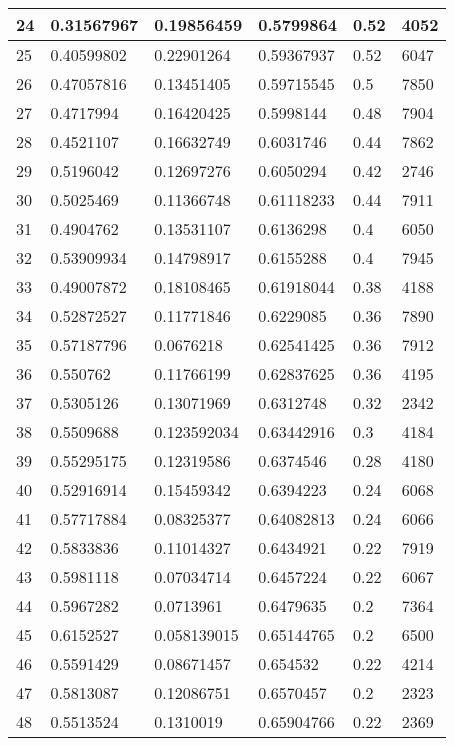 \begin{longtable}{|l|l|l|l|l|l|}
24 & 0.31567967 & 0.19856459 & 0.5799864 & 0.52 & 4052 \\ \hline 
25 & 0.40599802 & 0.22901264 & 0.59367937 & 0.52 & 6047 \\ \hline 
26 & 0.47057816 & 0.13451405 & 0.59715545 & 0.5 & 7850 \\ \hline 
27 & 0.4717994 & 0.16420425 & 0.5998144 & 0.48 & 7904 \\ \hline 
28 & 0.4521107 & 0.16632749 & 0.6031746 & 0.44 & 7862 \\ \hline 
29 & 0.5196042 & 0.12697276 & 0.6050294 & 0.42 & 2746 \\ \hline 
30 & 0.5025469 & 0.11366748 & 0.61118233 & 0.44 & 7911 \\ \hline 
31 & 0.4904762 & 0.13531107 & 0.6136298 & 0.4 & 6050 \\ \hline 
32 & 0.53909934 & 0.14798917 & 0.6155288 & 0.4 & 7945 \\ \hline 
33 & 0.49007872 & 0.18108465 & 0.61918044 & 0.38 & 4188 \\ \hline 
34 & 0.52872527 & 0.11771846 & 0.6229085 & 0.36 & 7890 \\ \hline 
35 & 0.57187796 & 0.0676218 & 0.62541425 & 0.36 & 7912 \\ \hline 
36 & 0.550762 & 0.11766199 & 0.62837625 & 0.36 & 4195 \\ \hline 
37 & 0.5305126 & 0.13071969 & 0.6312748 & 0.32 & 2342 \\ \hline 
38 & 0.5509688 & 0.123592034 & 0.63442916 & 0.3 & 4184 \\ \hline 
39 & 0.55295175 & 0.12319586 & 0.6374546 & 0.28 & 4180 \\ \hline 
40 & 0.52916914 & 0.15459342 & 0.6394223 & 0.24 & 6068 \\ \hline 
41 & 0.57717884 & 0.08325377 & 0.64082813 & 0.24 & 6066 \\ \hline 
42 & 0.5833836 & 0.11014327 & 0.6434921 & 0.22 & 7919 \\ \hline 
43 & 0.5981118 & 0.07034714 & 0.6457224 & 0.22 & 6067 \\ \hline 
44 & 0.5967282 & 0.0713961 & 0.6479635 & 0.2 & 7364 \\ \hline 
45 & 0.6152527 & 0.058139015 & 0.65144765 & 0.2 & 6500 \\ \hline 
46 & 0.5591429 & 0.08671457 & 0.654532 & 0.22 & 4214 \\ \hline 
47 & 0.5813087 & 0.12086751 & 0.6570457 & 0.2 & 2323 \\ \hline 
48 & 0.5513524 & 0.1310019 & 0.65904766 & 0.22 & 2369 \\ \hline 

\end{longtable}
